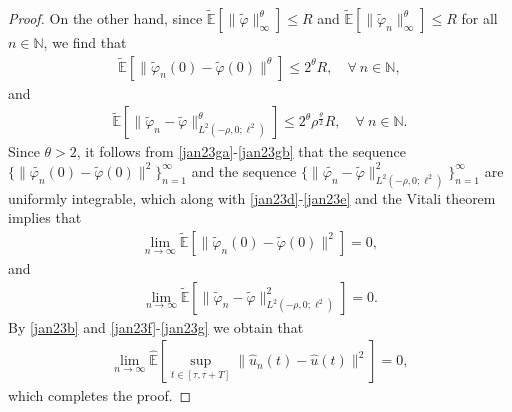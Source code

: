 \documentclass[11pt]{article}
\numberwithin{equation}{section}
\theoremstyle{plain}
\begin{document}
\begin{proof}
On the other hand,
since  
$ \widetilde{\mathbb{E}} 
          \left[ \| {\widetilde{\varphi}} \|^\theta_\infty
          \right] 
     \le R$ and
 $ \widetilde{\mathbb{E}} 
          \left[ \| {\widetilde{\varphi}}_n\|^\theta_\infty
          \right] 
     \le R$
for all $n \in \mathbb{N}$,
we find that
\begin{align} \label{jan23ga}
 \widetilde{\mathbb{E}} 
       \left[ \|{\widetilde{\varphi}}_n(0) - \widetilde{\varphi}(0)\|^\theta \right]
  \le  2^\theta R, \quad 
               \forall \ n \in \mathbb{N},
\end{align}
and 
\begin{align} \label{jan23gb}
 \widetilde{\mathbb{E}} 
       \left[ \| {\widetilde{\varphi}}_n 
                    - \widetilde{\varphi}\|^\theta_{L^2(-\rho, 0; \ell^2)}  
       \right]
 \le 2^\theta  \rho^{\frac \theta{2}} R, \quad 
               \forall \ n\in \mathbb{N}.
\end{align}
Since  $\theta>2$, it follows from
\eqref{jan23ga}-\eqref{jan23gb}
that
the sequence 
$\{\|\widetilde{\varphi_n}(0) - \widetilde{\varphi}(0)\|^2\}_{n=1}^\infty$
and the sequence 
 $\{ \| \widetilde{\varphi_n} - \widetilde{\varphi} 
       \|^2_{L^2(-\rho, 0; \ell^2)}
   \}_{n=1}^\infty$
are uniformly integrable,
which along with \eqref{jan23d}-\eqref{jan23e}
and the  Vitali  theorem 
implies that   
\begin{align} \label{jan23f}
 \lim_{n \to \infty}
      \widetilde{\mathbb{E}} 
             \left[ \| \widetilde{\varphi}_n(0) - \widetilde{\varphi}(0) \|^2 \right]
   = 0,
\end{align}
 and 
\begin{align} \label{jan23g}
 \lim_{n \to \infty}
      \widetilde{\mathbb{E}} 
       \left[ \| {\widetilde{\varphi}}_n - \widetilde{\varphi} \|^2_{L^2(-\rho, 0; \ell^2)}     
      \right] 
  = 0.
\end{align}
 By
 \eqref{jan23b}
 and
 \eqref{jan23f}-\eqref{jan23g}  we obtain
 that  
\begin{align}\label{feb23a}
 \lim_{n\to \infty}
 \widehat{\mathbb{E}}
       \left[ \sup_{t \in [\tau, \tau +T]}
                            \| \hat{u}_n(t) - \hat{u}(t) \|^2
       \right]  
  = 0,
\end{align}
which  completes the proof.
  \end{proof}
\end{document}

